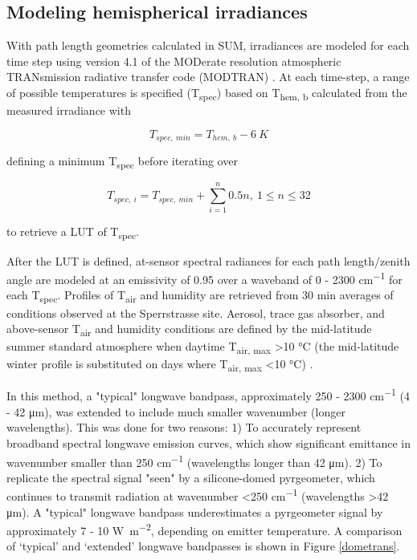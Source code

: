 \begin{bibunit}
\subsection{Modeling hemispherical irradiances}
With path length geometries calculated in SUM, irradiances are modeled for each time step using version 4.1 of the MODerate resolution atmospheric TRANsmission radiative transfer code (MODTRAN) \citep{Berk1987}. At each time-step, a range of possible temperatures is specified (T\textsubscript{spec}) based on T\textsubscript{hem, b} calculated from the measured irradiance with

\begin{equation}
	T_{spec, ~min} = T_{hem, ~b} - 6 ~K 
\end{equation}

\noindent defining a minimum T\textsubscript{spec} before iterating over

\begin{equation}
T_{spec, ~i} = T_{spec, ~min} + \displaystyle\sum_{i = 1}^{n} 0.5n, ~1 \leq n \leq 32
\end{equation}

\noindent to retrieve a LUT of T\textsubscript{spec}. 

After the LUT is defined, at-sensor spectral radiances for each path length/zenith angle are modeled at an emissivity of 0.95 over a waveband of 0 - 2300 \si{cm^{-1}} for each T\textsubscript{spec}. Profiles of T\textsubscript{air} and humidity are retrieved from 30 \si{\minute} averages of conditions observed at the Sperrstrasse site. Aerosol, trace gas absorber, and above-sensor T\textsubscript{air} and humidity conditions are defined by the mid-latitude summer standard atmosphere when daytime T\textsubscript{air, max} \textgreater 10 \si{\degreeCelsius} (the mid-latitude winter profile is substituted on days where T\textsubscript{air, max} \textless 10 \si{\degreeCelsius}) \citep{Kantor1962}. 

In this method, a "typical" longwave bandpass, approximately 250 - 2300 \si{\centi\meter^{-1}} (4 - 42 \si{\micro\meter}), was extended to include much smaller wavenumber (longer wavelengths). This was done for two reasons: 1) To accurately represent broadband spectral longwave emission curves, which show significant emittance in wavenumber smaller than 250 \si{cm^{-1}} (wavelengths longer than 42 \si{\micro\meter}). 2) To replicate the spectral signal "seen" by a silicone-domed pyrgeometer, which continues to transmit radiation at wavenumber \textless 250 \si{cm^{-1}} (wavelengths \textgreater 42 \si{\micro\meter}). A "typical" longwave bandpass underestimates a pyrgeometer signal by approximately 7 - 10 \si{\watt\per\square\meter}, depending on emitter temperature. A comparison of ‘typical’ and ‘extended’ longwave bandpasses is shown in Figure \ref{dometrans}.


\end{bibunit}
